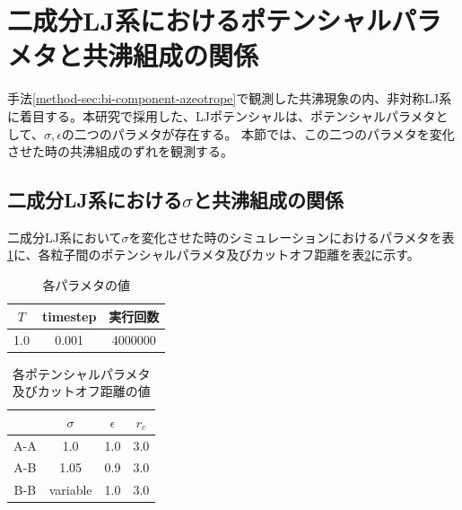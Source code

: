 \documentclass[titlepage]{jsreport}
\begin{document}
\section{二成分LJ系におけるポテンシャルパラメタと共沸組成の関係} \label{method-sec:bi-component-potential-parameter-azeotrope-ratio}
手法\ref{method-sec:bi-component-azeotrope}で観測した共沸現象の内、非対称LJ系に着目する。本研究で採用した、LJポテンシャルは、ポテンシャルパラメタとして、${\sigma}$,\,${\epsilon}$の二つのパラメタが存在する。
本節では、この二つのパラメタを変化させた時の共沸組成のずれを観測する。


\subsection{二成分LJ系における$\sigma$と共沸組成の関係} \label{method-subsec:bi-component-sigma-azeotrope-ratio}
二成分LJ系において${\sigma}$を変化させた時のシミュレーションにおけるパラメタを表\ref{table:bi-component-sigma-azeotrope-ratio-parameter}に、各粒子間のポテンシャルパラメタ及びカットオフ距離を表\ref{table:bi-component-sigma-azeotrope-ratio-potential-parameter}に示す。

\begin{table}[htbp]
    \begin{center}
        \caption{各パラメタの値}
        \label{table:bi-component-sigma-azeotrope-ratio-parameter}
        \begin{tabular}{c c c}
            $T$ & timestep & 実行回数 \\
            \hline
            1.0 & 0.001 & 4000000 \\
        \end{tabular}
    \end{center}
\end{table}

\begin{table}[htbp]
    \begin{center}
        \caption{各ポテンシャルパラメタ及びカットオフ距離の値}
        \label{table:bi-component-sigma-azeotrope-ratio-potential-parameter}
        \begin{tabular}{c c c c}
            & $\sigma$ & $\epsilon$ & $r_c$ \\
            \hline
            A-A & 1.0 & 1.0 & 3.0 \\
            A-B & 1.05 & 0.9 & 3.0 \\
            B-B & variable & 1.0 & 3.0
        \end{tabular}
    \end{center}
\end{table}
\end{document}
